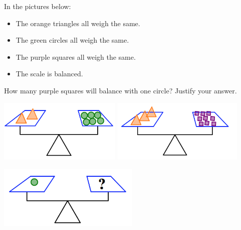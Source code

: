 \bigskip

\begin{problem}\label{prob: balance1}
In the pictures below:
\begin{itemize}
\item
The orange triangles all weigh the same.  
\item
The green circles all weigh the same.  
\item
The purple squares all weigh the same.  
\item
The scale is balanced.
\end{itemize}
How many purple squares will balance with one circle?  Justify your answer.
\begin{center}
\includegraphics[height=3cm]{balance1a}\quad
\includegraphics[height=3cm]{balance1b}

\includegraphics[height=3cm]{balance1c}

\end{center}

\end{problem}

\bigskip

